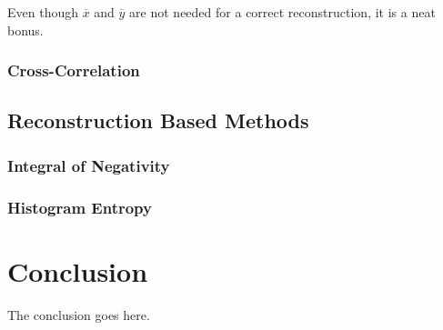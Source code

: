 \documentclass[10pt,journal,compsoc]{IEEEtran}
\begin{document}
%
Even though $\overline{x}$ and $\overline{y}$ are not needed for a correct reconstruction, it is a neat bonus.


\subsubsection{Cross-Correlation}

\subsection{Reconstruction Based Methods}

\subsubsection{Integral of Negativity}

\subsubsection{Histogram Entropy}

\section{Conclusion}
The conclusion goes here.






%
\end{document}
